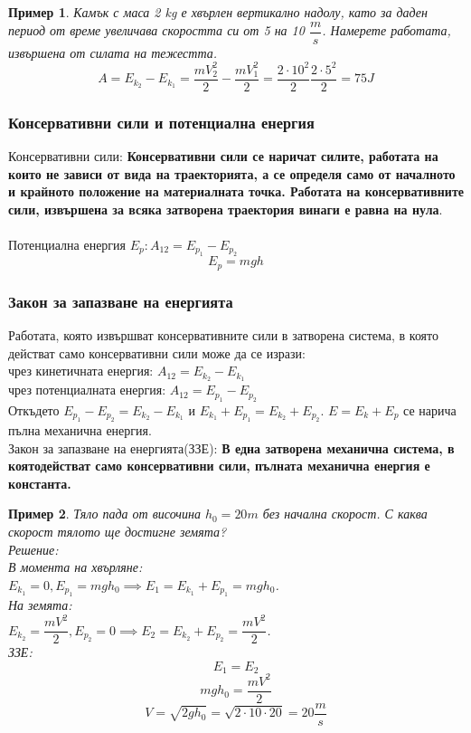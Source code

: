 \documentclass[fleqn]{article}
\newtheorem{example}{Пример}[subsection]
\begin{document}
\begin{example}
Камък с маса 2 kg е хвърлен вертикално надолу, като за даден период от време увеличава скоростта си от 5 на 10 $\dfrac{m}{s}$. Намерете работата, извършена от силата на тежестта.
$$A = E_{k_2} - E_{k_1} = \dfrac{mV_2^2}{2} - \dfrac{mV_1^2}{2} = \dfrac{2 \cdot 10^2}{2} \dfrac{2 \cdot 5^2}{2} = 75J$$
\end{example}

\subsubsection{Консервативни сили и потенциална енергия}

Консервативни сили: \textbf{Консервативни сили се наричат силите, работата на които не зависи от вида на траекторията, а се определя само от началното и крайното положение на материалната точка. Работата на консервативните сили, извършена за всяка затворена траектория винаги е равна на нула}. \\
\\
Потенциална енергия $E_p: A_{12} = E_{p_1} - E_{p_2}$
$$E_p = mgh$$

\subsubsection{Закон за запазване на енергията}
Работата, която извършват консервативните сили в затворена система, в която действат само консервативни сили може да се изрази:\\
чрез кинетичната енергия: $A_{12} = E_{k_2} - E_{k_1}$ \\
чрез потенциалната енергия: $A_{12} = E_{p_1} - E_{p_2}$ \\
Откъдето $E_{p_1} - E_{p_2} = E_{k_2} - E_{k_1}$ и $E_{k_1} + E_{p_1} = E_{k_2} + E_{p_2} $. $E = E_k + E_p$ се нарича пълна механична енергия. \\
Закон за запазване на енергията(ЗЗЕ): \textbf{В една затворена механична система, в коятодействат само консервативни сили, пълната механична енергия е константа.}

\begin{example}
Тяло пада от височина $h_0 = 20m$ без начална скорост. С каква скорост тялото ще достигне земята? \\
Решение:\\
В момента на хвърляне: \\
$E_{k_1} = 0, E_{p_1} = mgh_0 \implies E_1 = E_{k_1} + E_{p_1} = mgh_0$. \\
На земята: \\
$E_{k_2} = \dfrac{mV^2}{2}, E_{p_2} = 0 \implies E_2 = E_{k_2} + E_{p_2} = \dfrac{mV^2}{2}$. \\
ЗЗЕ: 
$$E_1 = E_2$$
$$mgh_0 = \dfrac{mV^2}{2}$$
$$V = \sqrt{2gh_0} = \sqrt{2\cdot 10 \cdot 20} = 20 \dfrac{m}{s}$$
\end{example}
\end{document}
